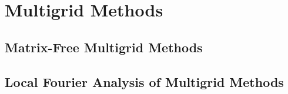 \chapter{Multigrid Methods}\label{ch:MultigridMethods}


\section{Matrix-Free Multigrid Methods}\label{sec:matrixfreemultigrid}


\section{Local Fourier Analysis of Multigrid Methods}\label{sec:lfaofmultigrid}

